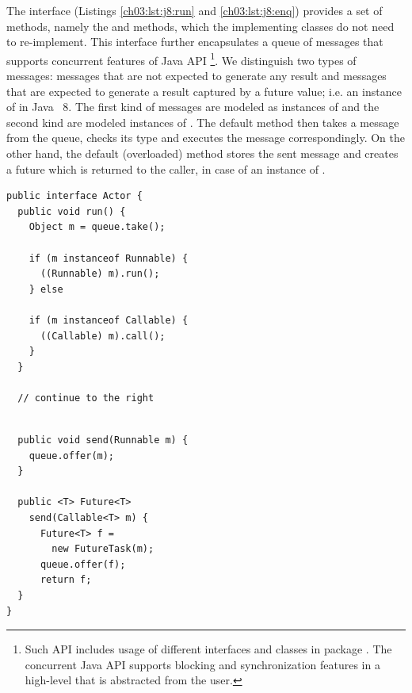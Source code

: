 The  interface (Listings \ref{ch03:lst:j8:run} and \ref{ch03:lst:j8:enq})
provides a set of  methods, namely the  and  methods,  which the implementing classes do not need to re-implement.
This interface further  encapsulates a queue of messages that supports concurrent features of Java API
\footnote{Such API includes usage of different interfaces and classes in  package \cite{jsr166}.
The concurrent Java API supports blocking and synchronization features in a high-level that is abstracted from the user.}.
We distinguish two types of messages:
messages that are  not expected to generate  any result and messages that are  expected to generate a result captured by a future value; i.e. 
an instance of  in Java~ 8.
The first kind of messages are modeled as instances of  and the second kind are modeled instances of .
The default  method then takes a message from the queue, checks its type and executes the message correspondingly.
On the other hand, the default (overloaded)  method stores the sent message and creates a future
which is returned to the caller, in case of an instance of .

\begin{center}
\begin{minipage}[t]{0.48\textwidth}
\begin{lstlisting}[caption=Actor interface (1) ,label=lst:j8:run]
public interface Actor {
  public void run() {
    Object m = queue.take();

    if (m instanceof Runnable) {
      ((Runnable) m).run();
    } else 

    if (m instanceof Callable) {
      ((Callable) m).call();
    } 
  }

  // continue to the right
\end{lstlisting}
\end{minipage}
\hfill
\begin{minipage}[t]{0.48\textwidth}
\begin{lstlisting}[caption=Actor interface (2),label=lst:j8:enq]

  public void send(Runnable m) {
    queue.offer(m);
  }

  public <T> Future<T> 
    send(Callable<T> m) {
      Future<T> f = 
        new FutureTask(m);
      queue.offer(f);
      return f;
  }
}
\end{lstlisting}
\end{minipage}
\end{center}

